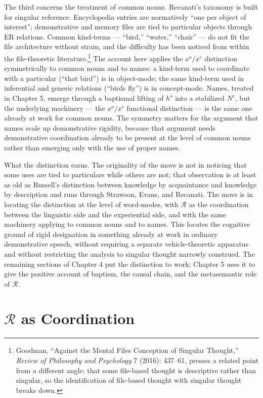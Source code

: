 \documentclass[10pt]{article}
\begin{document}
The third concerns the treatment of common nouns. Recanati's taxonomy is built for singular reference. Encyclopedia entries are normatively ``one per object of interest''; demonstrative and memory files are tied to particular objects through ER relations. Common kind-terms --- ``bird,'' ``water,'' ``chair'' --- do not fit the file architecture without strain, and the difficulty has been noticed from within the file-theoretic literature.\footnote{Goodman, ``Against the Mental Files Conception of Singular Thought,'' \emph{Review of Philosophy and Psychology} 7 (2016): 437--61, presses a related point from a different angle: that some file-based thought is descriptive rather than singular, so the identification of file-based thought with singular thought breaks down.} The account here applies the \(x^o/x^c\) distinction symmetrically to common nouns and to names: a kind-term used to coordinate with a particular (``that bird'') is in object-mode; the same kind-term used in inferential and generic relations (``birds fly'') is in concept-mode. Names, treated in Chapter 5, emerge through a baptismal lifting of \(h^o\) into a stabilized \(N^c\), but the underlying machinery --- the \(x^o/x^c\) functional distinction --- is the same one already at work for common nouns. The symmetry matters for the argument that names scale up demonstrative rigidity, because that argument needs demonstrative coordination already to be present at the level of common nouns rather than emerging only with the use of proper names.

What the distinction earns. The originality of the move is not in noticing that some uses are tied to particulars while others are not; that observation is at least as old as Russell's distinction between knowledge by acquaintance and knowledge by description and runs through Strawson, Evans, and Recanati. The move is in locating the distinction at the level of word-modes, with \(\mathcal{R}\) as the coordination between the linguistic side and the experiential side, and with the same machinery applying to common nouns and to names. This locates the cognitive ground of rigid designation in something already at work in ordinary demonstrative speech, without requiring a separate vehicle-theoretic apparatus and without restricting the analysis to singular thought narrowly construed. The remaining sections of Chapter 4 put the distinction to work; Chapter 5 uses it to give the positive account of baptism, the causal chain, and the metasemantic role of \(\mathcal{R}\).

\section{\texorpdfstring{\(\mathcal{R}\) as Coordination}{\textbackslash mathcal\{R\} as Coordination}}\label{mathcalr-as-coordination}
\end{document}
